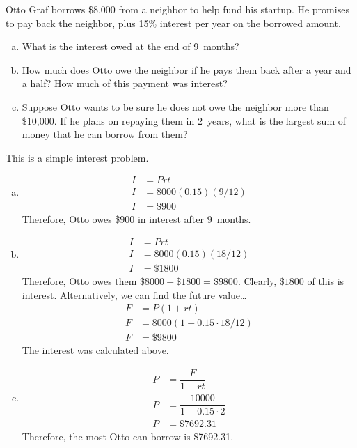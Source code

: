 \documentclass[11pt,letterpaper]{article}
\begin{document}

 Otto Graf borrows \$8,000 from a neighbor to help fund his startup. He promises to pay back the neighbor, plus 15\% interest per year on the borrowed amount. 
\begin{enumerate}[(a)]
\item What is the interest owed at the end of 9~months?
\item How much does Otto owe the neighbor if he pays them back after a year and a half? How much of this payment was interest?
\item Suppose Otto wants to be sure he does not owe the neighbor more than \$10,000. If he plans on repaying them in 2~years, what is the largest sum of money that he can borrow from them? 
\end{enumerate} \pspace

\sol This is a simple interest problem.
\begin{enumerate}[(a)]
\item 
	\[
	\begin{aligned}
	I&= Prt \\
	I&= 8000(0.15)(9/12) \\
	I&= \$900
	\end{aligned}
	\]
Therefore, Otto owes \$900 in interest after 9~months. \pspace

\item 
	\[
	\begin{aligned}
	I&= Prt \\
	I&= 8000(0.15)(18/12) \\
	I&= \$1800
	\end{aligned}
	\]
Therefore, Otto owes them $\$8000 + \$1800= \$9800$. Clearly, $\$1800$ of this is interest. Alternatively, we can find the future value\dots
	\[
	\begin{aligned}
	F&= P(1 + rt) \\
	F&= 8000(1 + 0.15 \cdot 18/12) \\
	F&= \$9800
	\end{aligned}
	\]
The interest was calculated above. \pspace

\item 
	\[
	\begin{aligned}
	P&= \dfrac{F}{1 + rt} \\
	P&= \dfrac{10000}{1 + 0.15 \cdot 2} \\
	P&= \$7692.31
	\end{aligned}
	\]
Therefore, the most Otto can borrow is \$7692.31. 
\end{enumerate}
\end{document}
